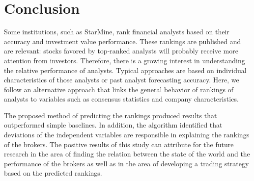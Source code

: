 \documentclass{article}\usepackage[]{graphicx}\usepackage[]{color}
\begin{document}


\section{Conclusion}
\label{sec:conclusion}
Some institutions, such as StarMine, rank financial analysts based on their accuracy and investment value performance. These rankings are published and are relevant: stocks favored by top-ranked analysts will probably receive more attention from investors. Therefore, there is a growing interest in understanding the relative performance of analysts. Typical approaches are based on individual characteristics of those analysts or past analyst forecasting accuracy. Here, we follow an alternative approach that links the general behavior of rankings of analysts to variables such as consensus statistics and company characteristics.


The proposed method of predicting the rankings produced  results that outperformed simple  baselines. In addition, the algorithm identified that deviations of the independent variables are responsible in explaining the rankings of the brokers. The positive results of this study can attribute for the future research in the area of finding the relation between the state of the world and the performance of the brokers as well as  in the area of developing a trading strategy based on the predicted rankings.
\end{document}
